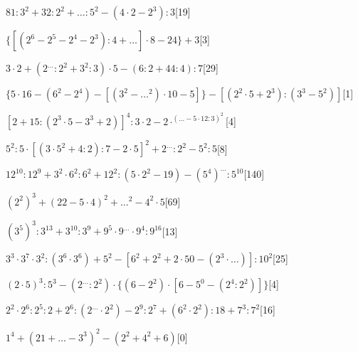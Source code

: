 \begin{esercizio} \label{ese:1.17}
\(81:3^2+32:2^2+{\dots}:5^2-(4\cdot2-2^3):3\)\hfill[19]
\end{esercizio}
\begin{esercizio} \label{ese:1.17}
\(\{[(2^6-2^5-2^4-2^3):4+{\dots}]\cdot8-24\}+3\)\hfill[3]
\end{esercizio}
\begin{esercizio} \label{ese:1.17}
\(3\cdot2+(2^{\dots}:2^2+3^2:3)\cdot5-(6:2+44:4):7\)\hfill[29]
\end{esercizio}
\begin{esercizio} \label{ese:1.17}
\(\{5\cdot16-(6^2-2^4)-[(3^2-{\dots}^2)\cdot10-5]\}-[(2^2\cdot5+2^3):(3^3-5^2)]\)\hfill[1]
\end{esercizio}
\begin{esercizio} \label{ese:1.17}
\([2+15:(2^3\cdot5-3^3+2)]^4:3\cdot2-2\cdot^({\dots}-5\cdot12:3)^2\)\hfill[4]
\end{esercizio}
\begin{esercizio} \label{ese:1.17}
\(5^2:5\cdot[(3\cdot5^2+4:2):7-2\cdot5]^2+2^{\dots}:2^2-5^2:5\)\hfill[8]
\end{esercizio}
\begin{esercizio} \label{ese:1.17}
\(12^{10}:12^9+3^2\cdot6^2:6^2+12^2:(5\cdot2^2-19)-(5^4)^{\dots}:5^{10}\)\hfill[140]
\end{esercizio}
\begin{esercizio} \label{ese:1.17}
\((2^2)^3+(22-5\cdot4)^2+{\dots}^2-4^2\cdot5\)\hfill[69]
\end{esercizio}
\begin{esercizio} \label{ese:1.17}
\((3^5)^3:3^{13}+3^{10}:3^9+9^5\cdot9^{\dots}\cdot9^4:9^{16}\)\hfill[13]
\end{esercizio}
\begin{esercizio} \label{ese:1.17}
\(3^3\cdot3^7\cdot3^2:(3^6\cdot3^6)+5^2-[6^2+2^2+2\cdot50-(2^3\cdot{\dots})]:10^2\)\hfill[25]
\end{esercizio}
\begin{esercizio} \label{ese:1.17}
\((2\cdot5)^3:5^3-(2^{\dots}:2^2)\cdot\{(6-2^2)\cdot[6-5^0-(2^4:2^2)]\}\)\hfill[4]
\end{esercizio}
\begin{esercizio} \label{ese:1.17}
\(2^2\cdot2^6:2^5:2+2^6:(2^{\dots}\cdot2^2)-2^9:2^7+(6^2\cdot2^2):18+7^3:7^2\)\hfill[16]
\end{esercizio}
\begin{esercizio} \label{ese:1.17}
\(1^4+(21+{\dots}-3^3)^2-(2^2+4^2+6)\)\hfill[0]
\end{esercizio}
